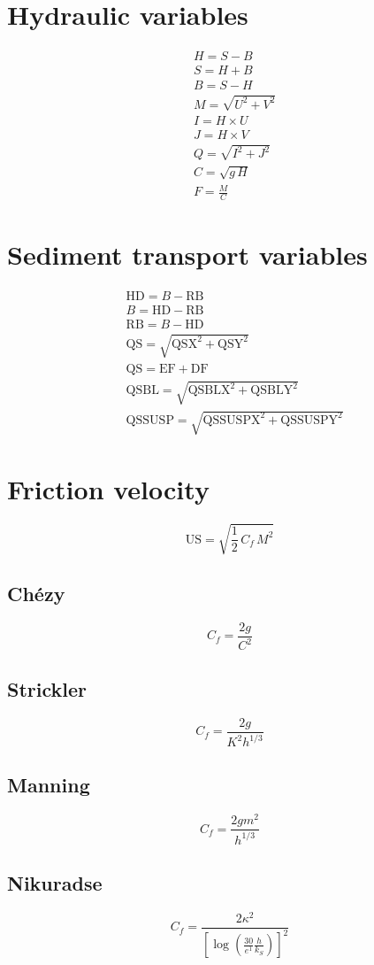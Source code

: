 \documentclass{article}
\newcommand{\HD}{\mathrm{HD}}
\newcommand{\RB}{\mathrm{RB}}
\newcommand{\EF}{\mathrm{EF}}
\newcommand{\DF}{\mathrm{DF}}
\newcommand{\QS}{\mathrm{QS}}
\newcommand{\QSX}{\mathrm{QSX}}
\newcommand{\QSY}{\mathrm{QSY}}
\newcommand{\QSBL}{\mathrm{QSBL}}
\newcommand{\QSBLX}{\mathrm{QSBLX}}
\newcommand{\QSBLY}{\mathrm{QSBLY}}
\newcommand{\QSSUSP}{\mathrm{QSSUSP}}
\newcommand{\QSSUSPX}{\mathrm{QSSUSPX}}
\newcommand{\QSSUSPY}{\mathrm{QSSUSPY}}
\newcommand{\US}{\mathrm{US}}
\begin{document}
\begin{multicols}{2}
\thispagestyle{empty}

\section{Hydraulic variables}
\[\begin{aligned}
& H = S-B\\
& S = H+B\\
& B = S-H\\
& M = \sqrt{U^2+V^2}\\
& I = H\times U\\
& J = H\times V\\
& Q = \sqrt{I^2 + J^2}\\
& C = \sqrt{g\,H}\\
& F = \frac{M}{C}
\end{aligned}\]

\section{Sediment transport variables}
\[\begin{aligned}
& \HD = B - \RB\\
& B = \HD - \RB\\
& \RB = B - \HD\\
& \QS = \sqrt{\QSX ^2 + \QSY ^2}\\
& \QS = \EF + \DF\\
& \QSBL = \sqrt{\QSBLX ^2 + \QSBLY ^2}\\
& \QSSUSP = \sqrt{\QSSUSPX ^2 + \QSSUSPY ^2}
\end{aligned}\]

\end{multicols}

\section{Friction velocity}
\[\US = \sqrt{\frac{1}{2}\,C_f\,M^2}\]
\begin{multicols}{2}
\subsection{Chézy}
\[C_f = \frac{2 g}{C^2}\]

\subsection{Strickler}
\[ C_f = \frac{2 g}{K^2 h^{1/3}}\]

\subsection{Manning}
\[ C_f = \frac{2 g m^2}{h^{1/3}}\]

\subsection{Nikuradse}

\[ C_f = \frac{2 \kappa^2}{ \left[ \log\left(\frac{30}{e^1} \frac{h}{k_S}\right) \right] ^2} \]
\end{multicols}
\end{document}
